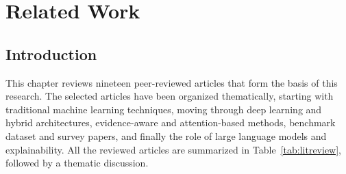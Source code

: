 \sloppy
\chapter{Related Work}
\section{Introduction}

This chapter reviews nineteen peer-reviewed articles that form the basis of this research. The selected articles have been organized thematically, starting with traditional machine learning techniques, moving through deep learning and hybrid architectures, evidence-aware and attention-based methods, benchmark dataset and survey papers, and finally the role of large language models and explainability. All the reviewed articles are summarized in Table~\ref{tab:litreview}, followed by a thematic discussion.

